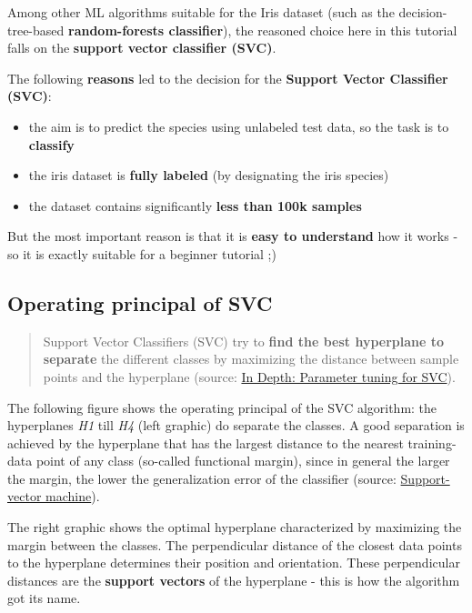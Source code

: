 \documentclass [oneside,10pt,a4paper,ngerman,BCOR10mm,headsepline,parindent,final]{scrartcl}
\providecommand{\tightlist}{%
      \setlength{\itemsep}{0pt}\setlength{\parskip}{0pt}}
\begin{document}
Among other ML algorithms suitable for the Iris dataset (such as the
decision-tree-based \textbf{random-forests classifier}), the reasoned
choice here in this tutorial falls on the \textbf{support vector
classifier (SVC)}.

The following \textbf{reasons} led to the decision for the
\textbf{Support Vector Classifier (SVC)}:

\begin{itemize}
\tightlist
\item
  the aim is to predict the species using unlabeled test data, so the
  task is to \textbf{classify}
\item
  the iris dataset is \textbf{fully labeled} (by designating the iris
  species)
\item
  the dataset contains significantly \textbf{less than 100k samples}
\end{itemize}

But the most important reason is that it is \textbf{easy to understand}
how it works - so it is exactly suitable for a beginner tutorial ;)

    \hypertarget{operating-principal-of-svc}{%
\subsection{Operating principal of
SVC}\label{operating-principal-of-svc}}

\begin{quote}
Support Vector Classifiers (SVC) try to \textbf{find the best hyperplane
to separate} the different classes by maximizing the distance between
sample points and the hyperplane (source:
\href{https://medium.com/all-things-ai/in-depth-parameter-tuning-for-svc-758215394769}{In
Depth: Parameter tuning for SVC}).
\end{quote}

The following figure shows the operating principal of the SVC algorithm:
the hyperplanes \emph{H1} till \emph{H4} (left graphic) do separate the
classes. A good separation is achieved by the hyperplane that has the
largest distance to the nearest training-data point of any class
(so-called functional margin), since in general the larger the margin,
the lower the generalization error of the classifier (source:
\href{https://en.wikipedia.org/wiki/Support-vector_machine}{Support-vector
machine}).

The right graphic shows the optimal hyperplane characterized by
maximizing the margin between the classes. The perpendicular distance of
the closest data points to the hyperplane determines their position and
orientation. These perpendicular distances are the \textbf{support
vectors} of the hyperplane - this is how the algorithm got its name.
\end{document}
